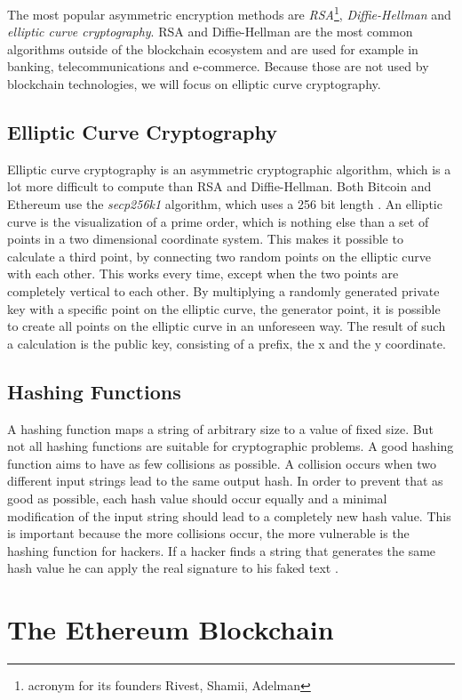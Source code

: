 The most popular asymmetric encryption methods are \textit{RSA}\footnote{acronym for its founders Rivest, Shamii, Adelman}, \textit{Diffie-Hellman} and \textit{elliptic curve cryptography}. RSA and Diffie-Hellman are the most common algorithms outside of the blockchain ecosystem and are used for example in banking, telecommunications and e-commerce. Because those are not used by blockchain technologies, we will focus on elliptic curve cryptography.
\subsection{Elliptic Curve Cryptography}
Elliptic curve cryptography is an asymmetric cryptographic algorithm, which is a lot more difficult to compute than RSA and Diffie-Hellman. Both Bitcoin and
Ethereum use the \textit{secp256k1} algorithm, which uses a 256 bit length \cite{secp256k1}. An elliptic curve is the visualization of a prime order, which is nothing else than a set of
points in a two dimensional coordinate system. This makes it possible to calculate a third point, by connecting two random points on the elliptic
curve with each other. This works every time, except when the two points are completely vertical to each other. By multiplying a randomly generated private key
with a specific point on the elliptic curve, the generator point, it is possible to create all points on the elliptic curve in an unforeseen way. The result of such a calculation is the public key, consisting of a prefix, the x and the y coordinate.

\subsection{Hashing Functions}
A hashing function maps a string of arbitrary size to a value of fixed size. But not all hashing functions are suitable for cryptographic problems. 
A good hashing function aims to have as few collisions as possible. A collision occurs when two different input strings lead to the same output hash.
In order to prevent that as good as possible, each hash value should occur equally and a minimal modification of the input string should lead to a
completely new hash value. This is important because the more collisions occur, the more vulnerable is the hashing function for hackers. If a hacker
finds a string that generates the same hash value he can apply the real signature to his faked text \cite[pp. 200-201]{Schmeh2007}.

\section{The Ethereum Blockchain}
